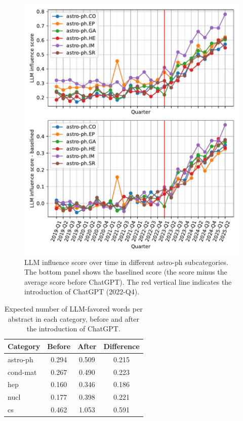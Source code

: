 \documentclass[twocolumn]{aastex701}
\begin{document}
\begin{figure}[h]
\centering
\includegraphics[width=\columnwidth]{scripts/figs/astro_subcats_score_vs_time.pdf}
\caption{
LLM influence score over time in different astro-ph subcategories.
The bottom panel shows the baselined score (the score minus the average score before ChatGPT).
The red vertical line indicates the introduction of ChatGPT (2022-Q4).
}
\label{fig:astro_subcat_comparison}
\end{figure}

\begin{table}
\centering
\begin{tabular}{lccc}
\toprule
Category & Before & After & Difference \\
\midrule
astro-ph & 0.294 & 0.509 & 0.215 \\
cond-mat & 0.267 & 0.490 & 0.223 \\
hep & 0.160 & 0.346 & 0.186 \\
nucl & 0.177 & 0.398 & 0.221 \\
cs & 0.462 & 1.053 & 0.591 \\
\bottomrule
\end{tabular}
\caption{Expected number of LLM-favored words per abstract in each category, before and after the introduction of ChatGPT.}
\label{tab:expected_words_per_abstract_before_after}
\end{table}
\end{document}
